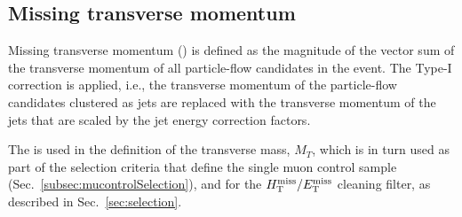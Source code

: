\subsection{Missing transverse momentum}
Missing transverse momentum (\met) is defined as the magnitude of the vector sum
of the transverse momentum of all particle-flow candidates in the event.
The Type-I \met correction \cite{Khachatryan:2014gga} is applied, i.e., the transverse momentum of
the particle-flow candidates clustered as jets are replaced with the
transverse momentum of the jets that are scaled by the jet energy
correction factors.

The \met is used in the definition of 
the transverse mass, $M_{T}$, which is in turn used as part of
the selection criteria that define the single muon control sample 
(Sec.~\ref{subsec:mucontrolSelection}), and for the $\mbox{$\mbox{$H_{\rm T}^{\rm miss}$} / \mbox{$E_\text{T}^{\rm miss}$}$}$ cleaning filter, 
as described in Sec.~\ref{sec:selection}.



